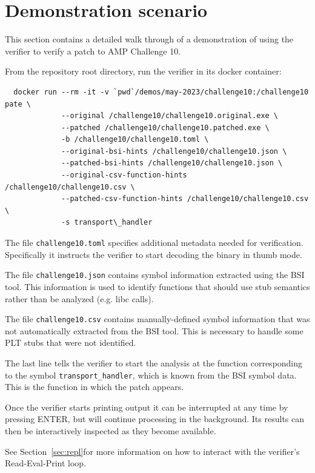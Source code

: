 \section{Demonstration scenario}
\label{sec:demonstr-scen}

This section contains a detailed walk through of a demonstration of
using the verifier to verify a patch to AMP Challenge 10.

From the repository root directory, run the verifier in its docker container:
\begin{verbatim}
  docker run --rm -it -v `pwd`/demos/may-2023/challenge10:/challenge10 pate \
             --original /challenge10/challenge10.original.exe \
             --patched /challenge10/challenge10.patched.exe \
             -b /challenge10/challenge10.toml \
             --original-bsi-hints /challenge10/challenge10.json \
             --patched-bsi-hints /challenge10/challenge10.json \
             --original-csv-function-hints /challenge10/challenge10.csv \
             --patched-csv-function-hints /challenge10/challenge10.csv \
             -s transport\_handler
\end{verbatim}

The file \texttt{challenge10.toml} specifies additional metadata needed for
verification. Specifically it instructs the verifier to start decoding
the binary in thumb mode.

The file \texttt{challenge10.json} contains symbol information extracted
using the BSI tool. This information is used to identify functions that
should use stub semantics rather than be analyzed (e.g. libc calls).

The file \texttt{challenge10.csv} contains manually-defined symbol
information that was not automatically extracted from the BSI tool. This
is necessary to handle some PLT stubs that were not identified.

The last line tells the verifier to start the analysis at the function
corresponding to the symbol \texttt{transport\_handler}, which is known from
the BSI symbol data.  This is the function in which the patch appears.

Once the verifier starts printing output it can be interrupted at any time by pressing
ENTER, but will continue processing in the background. Its results can then be
interactively inspected as they become available.

See Section~\ref{sec:repl}for more information on how to
interact with the verifier's Read-Eval-Print loop.

